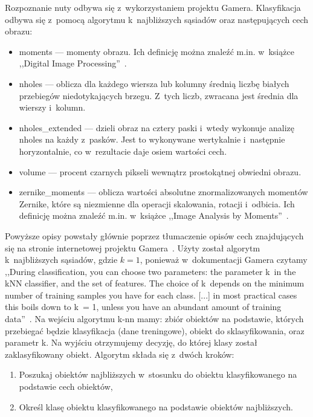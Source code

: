 \documentclass[polish,thesis,12pt]{dcsbook}
\begin{document}
Rozpoznanie nuty odbywa się z~wykorzystaniem projektu Gamera. Klasyfikacja odbywa się z~pomocą algorytmu k~najbliższych sąsiadów oraz następujących cech obrazu:

\begin{itemize}
  \item moments --- momenty obrazu. Ich definicję można znaleźć m.in. w~książce ,,Digital Image Processing''~\cite{Gonzalez:2006:DIP:1076432}.
  \item nholes --- oblicza dla każdego wiersza lub kolumny średnią liczbę białych przebiegów niedotykających brzegu. Z~tych liczb, zwracana jest średnia dla wierszy i~kolumn.
  \item nholes\_extended ---  dzieli obraz na cztery paski i~wtedy wykonuje analizę nholes na każdy z~pasków. Jest to wykonywane wertykalnie i~następnie horyzontalnie, co w~rezultacie daje osiem wartości cech.
  \item volume --- procent czarnych pikseli wewnątrz prostokątnej obwiedni obrazu.
  \item zernike\_moments --- oblicza wartości absolutne znormalizowanych momentów Zernike, które są niezmienne dla operacji skalowania, rotacji i~odbicia. Ich definicję można znaleźć m.in. w~książce ,,Image Analysis by Moments''~\cite{Pawlak}.
\end{itemize}

Powyższe opisy powstały głównie poprzez tłumaczenie opisów cech znajdujących się na stronie internetowej projektu Gamera~\cite{Gamera:features}.
Użyty został algorytm k~najbliższych sąsiadów, gdzie $k = 1$, ponieważ w~dokumentacji Gamera czytamy ,,During classification, you can choose two parameters: the parameter k~in the kNN classifier, and the set of features. The choice of k~depends on the minimum number of training samples you have for each class. [...] in most practical cases this boils down to k~= 1, unless you have an abundant amount of training data''~\cite{Gamera:tutorial}. Na wejściu algorytmu k-nn mamy: zbiór obiektów na podstawie, których przebiegać będzie klasyfikacja (dane treningowe), obiekt do sklasyfikowania, oraz parametr k. Na wyjściu otrzymujemy decyzję, do której klasy został zaklasyfikowany obiekt. Algorytm składa się z~dwóch kroków:

\begin{enumerate}
  \item Poszukaj obiektów najbliższych w~stosunku do obiektu klasyfikowanego na podstawie cech obiektów,
  \item Określ klasę obiektu klasyfikowanego na podstawie obiektów najbliższych.
\end{enumerate}
\end{document}
